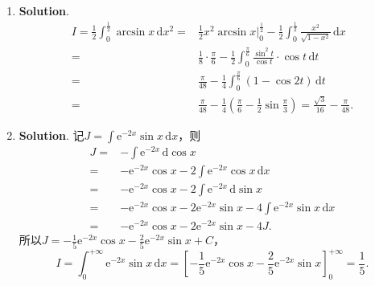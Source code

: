 \documentclass[../main.tex]{subfiles}
\begin{document}
\begin{enumerate}
    \item \textbf{Solution}.
          \[
              \begin{aligned}
                  I = \frac{1}{2}\int_{0}^{\frac{1}{2}}\arcsin x\,\mathrm{d}x^{2} = {} & \frac{1}{2}x^{2}\arcsin x\bigg|_{0}^{\frac{1}{2}}-\frac{1}{2}\int_{0}^{\frac{1}{2}}\frac{x^2}{\sqrt{1-x^2}}\,\mathrm{d}x \\
                  = {}                                                                 & \frac{1}{8}\cdot\frac{\pi}{6}-\frac{1}{2}\int_{0}^{\frac{\pi}{6}}\frac{\sin^2 t}{\cos t}\cdot \cos t\,\mathrm{d}t        \\
                  = {}                                                                 & \frac{\pi}{48}-\frac{1}{4}\int_{0}^{\frac{\pi}{6}}(1-\cos 2t)\,\mathrm{d}t                                               \\
                  = {}                                                                 & \frac{\pi}{48}-\frac{1}{4}\left(\frac{\pi}{6}-\frac{1}{2}\sin\frac{\pi}{3}\right) = \frac{\sqrt{3}}{16}-\frac{\pi}{48}.
              \end{aligned}
          \]

    \item \textbf{Solution}. 记$J = \int \mathrm{e}^{-2x}\sin x\,\mathrm{d}x$，则
          \[
              \begin{aligned}
                  J = {} & -\int \mathrm{e}^{-2x}\,\mathrm{d}\cos x                                                      \\
                  = {}   & -\mathrm{e}^{-2x}\cos x - 2\int \mathrm{e}^{-2x}\cos x\,\mathrm{d}x                           \\
                  = {}   & -\mathrm{e}^{-2x}\cos x - 2\int \mathrm{e}^{-2x}\,\mathrm{d}\sin x                            \\
                  = {}   & -\mathrm{e}^{-2x}\cos x - 2\mathrm{e}^{-2x}\sin x - 4\int \mathrm{e}^{-2x}\sin x\,\mathrm{d}x \\
                  = {}   & -\mathrm{e}^{-2x}\cos x - 2\mathrm{e}^{-2x}\sin x - 4J.
              \end{aligned}
          \]
          所以$J = -\frac{1}{5}\mathrm{e}^{-2x}\cos x - \frac{2}{5}\mathrm{e}^{-2x}\sin
              x + C$，
          \[
              I=\int_{0}^{+\infty}\mathrm{e}^{-2x}\sin x\,\mathrm{d}x=\left[-\frac{1}{5}\mathrm{e}
                  ^{-2x}\cos x - \frac{2}{5}\mathrm{e}^{-2x}\sin x\right]_{0}^{+\infty}=\frac{1}{5}.
          \]


\end{enumerate}
\end{document}
